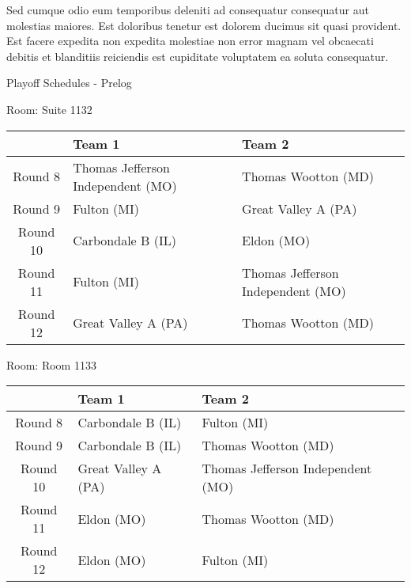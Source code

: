 \documentclass{article}%
\begin{document}
\newline%
Sed cumque odio eum temporibus deleniti ad consequatur consequatur aut molestias maiores. Est doloribus tenetur est dolorem ducimus sit quasi provident. Est facere expedita non expedita molestiae non error magnam vel obcaecati debitis et blanditiis reiciendis est cupiditate voluptatem ea soluta consequatur.%
\newpage%
\begin{center}%
\begin{Huge}%
Playoff Schedules {-} Prelog%
\end{Huge}%
\end{center}%
\begin{flushleft}%
\begin{Large}%
Room: Suite 1132%
\end{Large}%
\end{flushleft}%
\begin{tabularx}{\textwidth}{|c|Y|Y|}%
\hline%
&Team 1&Team 2\\%
\hline%
Round 8&Thomas Jefferson Independent (MO)&Thomas Wootton (MD)\\%
Round 9&Fulton (MI)&Great Valley A (PA)\\%
Round 10&Carbondale B (IL)&Eldon (MO)\\%
Round 11&Fulton (MI)&Thomas Jefferson Independent (MO)\\%
Round 12&Great Valley A (PA)&Thomas Wootton (MD)\\%
\hline%
\end{tabularx}%
\vspace*{8pt}%
\linebreak%
\begin{flushleft}%
\begin{Large}%
Room: Room 1133%
\end{Large}%
\end{flushleft}%
\begin{tabularx}{\textwidth}{|c|Y|Y|}%
\hline%
&Team 1&Team 2\\%
\hline%
Round 8&Carbondale B (IL)&Fulton (MI)\\%
Round 9&Carbondale B (IL)&Thomas Wootton (MD)\\%
Round 10&Great Valley A (PA)&Thomas Jefferson Independent (MO)\\%
Round 11&Eldon (MO)&Thomas Wootton (MD)\\%
Round 12&Eldon (MO)&Fulton (MI)\\%
\hline%
\end{tabularx}%
\vspace*{8pt}%
\end{document}
